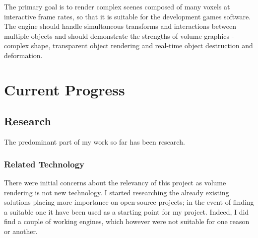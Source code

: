 \documentclass[11pt,fleqn,twoside]{article}
\begin{document}
The primary goal is to render complex scenes composed of many voxels at interactive frame rates, so that it is suitable for the development games software. The engine should handle simultaneous transforms and interactions between multiple objects and should demonstrate the strengths of volume graphics - complex shape, transparent object rendering and real-time object destruction and deformation.


\section{Current Progress}


\subsection{Research}
The predominant part of my work so far has been research.

\subsubsection{Related Technology}
There were initial concerns about the relevancy of this project as volume rendering is not new technology. I started researching the already existing solutions placing more importance on open-source projects; in the event of finding a suitable one it have been used as a starting point for my project. Indeed, I did find a couple of working engines, which however were not suitable for one reason or another.
\end{document}
